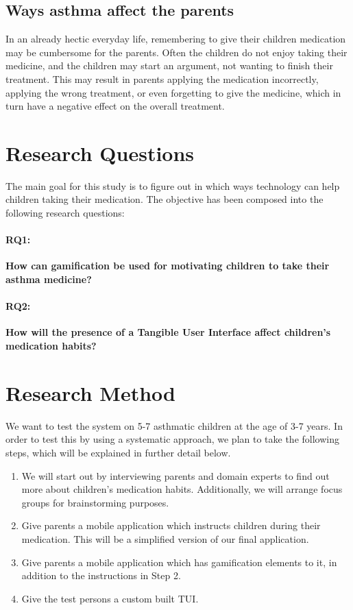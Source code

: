 \subsection{Ways asthma affect the parents}
In an already hectic everyday life, remembering to give their children medication may be cumbersome for the parents. Often the children do not enjoy taking their medicine, and the children may start an argument, not wanting to finish their treatment. This may result in parents applying the medication incorrectly, applying the wrong treatment, or even forgetting to give the medicine, which in turn have a negative effect on the overall treatment.  



\section{Research Questions}
\label{sec:researchquestions}
The main goal for this study is to figure out in which ways technology can help children taking their medication. The objective has been composed into the following research questions: 

\paragraph{RQ1:}
\textbf{How can gamification be used for motivating children to take their asthma medicine?}


\paragraph{RQ2:}
\textbf{How will the presence of a Tangible User Interface affect children's medication habits?}


\section{Research Method}
\label{sec:researchmethod}

We want to test the system on 5-7 asthmatic children at the age of 3-7 years. In order to test this by using a systematic approach, we plan to take the following steps, which will be explained in further detail below. 

\begin{enumerate}
  \item We will start out by interviewing parents and domain experts to find out more about children's medication habits. Additionally, we will arrange focus groups for brainstorming purposes.
  \item Give parents a mobile application which instructs children during their medication. This will be a simplified version of our final application.  
  \item Give parents a mobile application which has gamification elements to it, in addition to the instructions in Step 2. 
  \item Give the test persons a custom built TUI. 
\end{enumerate}
 

